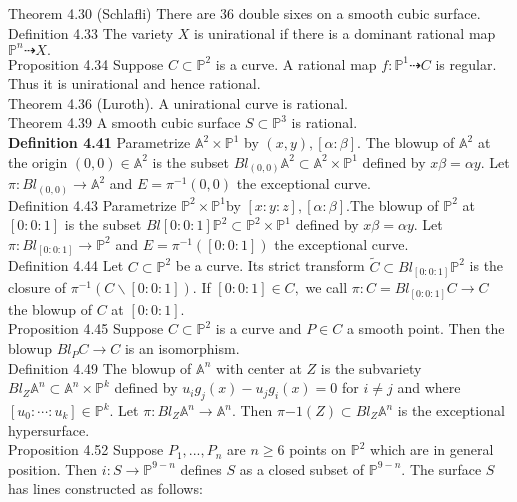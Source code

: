 \documentclass[8pt]{extarticle}
\begin{document}
Theorem 4.30 (Schlafli) There are $36$ double sixes on a smooth cubic surface.\\
Definition 4.33 The variety $X$ is unirational if there is a dominant rational map $\mathbb{P}^n \dashrightarrow X.$\\
Proposition 4.34 Suppose $C \subset \mathbb{P}^2$ is a curve. A rational map $f: \mathbb{P}^1 \dashrightarrow C$ is regular. Thus it is unirational and hence rational.\\
Theorem 4.36 (Luroth). A unirational curve is rational.\\
Theorem 4.39 A smooth cubic surface $S \subset \mathbb{P}^3$ is rational.\\
\textbf{Definition 4.41} Parametrize $\mathbb{A}^2 \times \mathbb{P}^1$ by $(x, y), [\alpha : \beta].$ The blowup of $\mathbb{A}^2$ at the origin $(0,0) \in \mathbb{A}^2$ is
the subset $Bl_{(0,0)}\mathbb{A}^2 \subset \mathbb{A}^2 \times \mathbb{P}^1$ defined by $x\beta=\alpha y.$ Let $\pi: Bl_{(0,0)} \rightarrow \mathbb{A}^2$ and $E = \pi^{-1}(0,0)$ the exceptional curve.\\
Definition 4.43 Parametrize $\mathbb{P}^2\times \mathbb{P}^1 $by $[x:y:z],[\alpha:\beta].$The blowup of $\mathbb{P}^2$ at $[0:0:1]$ is the subset $Bl[0:0:1]\mathbb{P}^2 \subset \mathbb{P}^2 \times \mathbb{P}^1$ defined by $x\beta = \alpha y.$ Let $\pi: Bl_{[0:0:1]} \rightarrow \mathbb{P}^2$ and $E = \pi^{-1}([0:0:1])$ the exceptional curve.\\
Definition 4.44 Let $C \subset \mathbb{P}^2$ be a curve. Its strict transform $\tilde{C} \subset Bl_{[0:0:1]}\mathbb{P}^2$ is the closure of $\pi^{-1}(C \backslash [0:0:1]).$ If $[0:0:1] \in C,$ we call $\pi:\widehat{C}= Bl_{[0:0:1]}C \rightarrow C$ the blowup of $C$ at $[0:0:1].$\\
Proposition 4.45 Suppose $C \subset \mathbb{P}^2$ is a curve and $P \in C$ a smooth point. Then the blowup $Bl_P C \rightarrow C$ is an isomorphism.\\
Definition 4.49 The blowup of $\mathbb{A}^n$ with center at $Z$ is the subvariety $Bl_Z \mathbb{A}^n \subset \mathbb{A}^n \times \mathbb{P}^k$ defined by
$u_ig_j(x)-u_jg_i(x)=0$ for $i \neq j$ and where $[u_0:\cdots:u_k] \in \mathbb{P}^k.$ Let $\pi: Bl_Z\mathbb{A}^n \rightarrow \mathbb{A}^n.$ Then $\pi{-1}(Z) \subset Bl_Z\mathbb{A}^n$ is the exceptional hypersurface.\\
Proposition 4.52 Suppose $P_1,...,P_n$ are $n\ge 6$ points on $\mathbb{P}^2$ which are in general position. Then $i:S\rightarrow \mathbb{P}^{9-n}$ defines $S$ as a closed subset of $\mathbb{P}^{9-n}.$ The surface $S$ has lines constructed as follows:\\
\end{document}
